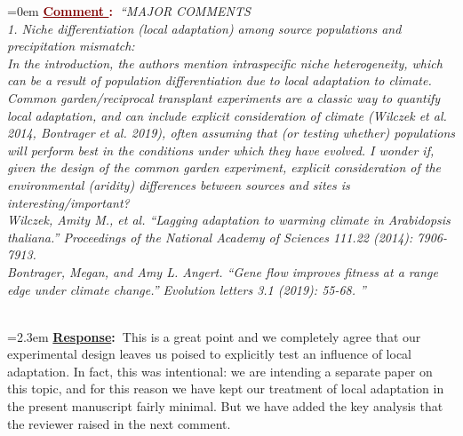 \documentclass[12pt]{article}
\newcounter{cN}
\newcommand{\comment}[1]{
	\vspace{2em}
	\refstepcounter{cN} %
	\noindent \hangindent=0em \textbf{\textcolor{Maroon}{\uline{Comment \thecN}:~}}\emph{``#1''}
	}
\newcommand{\response}[1]{
	\\[0.25em]
	\hangindent=2.3em \textbf{\textcolor{NavyBlue}{\uline{Response}:~}}#1
	}
\begin{document}
\comment{MAJOR COMMENTS
	\\
	1. Niche differentiation (local adaptation) among source populations and precipitation mismatch:
	\\
	In the introduction, the authors mention intraspecific niche heterogeneity, which can be a result of population differentiation due to local adaptation to climate. Common garden/reciprocal transplant experiments are a classic way to quantify local adaptation, and can include explicit consideration of climate (Wilczek et al. 2014, Bontrager et al. 2019), often assuming that (or testing whether) populations will perform best in the conditions under which they have evolved. I wonder if, given the design of the common garden experiment, explicit consideration of the environmental (aridity) differences between sources and sites is interesting/important?
	\\
	Wilczek, Amity M., et al. ``Lagging adaptation to warming climate in Arabidopsis thaliana.'' Proceedings of the National Academy of Sciences 111.22 (2014): 7906-7913.
	\\
	Bontrager, Megan, and Amy L. Angert. ``Gene flow improves fitness at a range edge under climate change.'' Evolution letters 3.1 (2019): 55-68.
}
\response{This is a great point and we completely agree that our experimental design leaves us poised to explicitly test an influence of local adaptation. In fact, this was intentional: we are intending a separate paper on this topic, and for this reason we have kept our treatment of local adaptation in the present manuscript fairly minimal. But we have added the key analysis that the reviewer raised in the next comment.}
\end{document}
